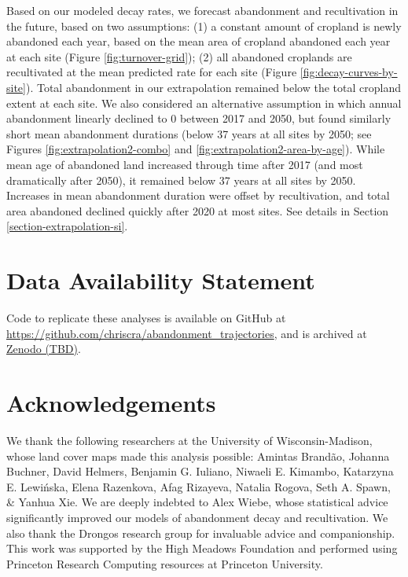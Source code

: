 \documentclass[9pt,twocolumn,twoside,]{pnas-new}
\begin{document}
Based on our modeled decay rates, we forecast abandonment and
recultivation in the future, based on two assumptions: (1) a constant
amount of cropland is newly abandoned each year, based on the mean area
of cropland abandoned each year at each site (Figure
\ref{fig:turnover-grid}); (2) all abandoned croplands are recultivated
at the mean predicted rate for each site (Figure
\ref{fig:decay-curves-by-site}). Total abandonment in our extrapolation
remained below the total cropland extent at each site. We also
considered an alternative assumption in which annual abandonment
linearly declined to 0 between 2017 and 2050, but found similarly short
mean abandonment durations (below 37 years at all sites by 2050; see
Figures \ref{fig:extrapolation2-combo} and
\ref{fig:extrapolation2-area-by-age}). While mean age of abandoned land
increased through time after 2017 (and most dramatically after 2050), it
remained below 37 years at all sites by 2050. Increases in mean
abandonment duration were offset by recultivation, and total area
abandoned declined quickly after 2020 at most sites. See details in
Section \ref{section-extrapolation-si}.

\hypertarget{data-availability-statement}{%
\section{Data Availability
Statement}\label{data-availability-statement}}

Code to replicate these analyses is available on GitHub at
\url{https://github.com/chriscra/abandonment_trajectories}, and is
archived at \href{https://doi.org/}{Zenodo (TBD)}.

\hypertarget{acknowledgements}{%
\section{Acknowledgements}\label{acknowledgements}}

We thank the following researchers at the University of
Wisconsin-Madison, whose land cover maps made this analysis possible:
Amintas Brandão, Johanna Buchner, David Helmers, Benjamin G. Iuliano,
Niwaeli E. Kimambo, Katarzyna E. Lewińska, Elena Razenkova, Afag
Rizayeva, Natalia Rogova, Seth A. Spawn, \& Yanhua Xie. We are deeply
indebted to Alex Wiebe, whose statistical advice significantly improved
our models of abandonment decay and recultivation. We also thank the
Drongos research group for invaluable advice and companionship. This
work was supported by the High Meadows Foundation and performed using
Princeton Research Computing resources at Princeton University.
\end{document}
